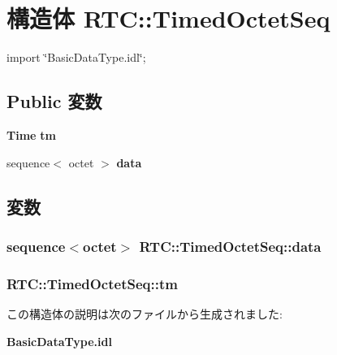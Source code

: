\section{構造体 RTC::TimedOctetSeq}
\label{structRTC_1_1TimedOctetSeq}


{\ttfamily import \char`\"{}BasicDataType.idl\char`\"{};}

\subsection*{Public 変数}
\begin{DoxyCompactItemize}
\item 
{\bf Time} {\bf tm}
\item 
sequence$<$ octet $>$ {\bf data}
\end{DoxyCompactItemize}


\subsection{変数}
\subsubsection[{data}]{\setlength{\rightskip}{0pt plus 5cm}sequence$<$octet$>$ {\bf RTC::TimedOctetSeq::data}}\label{structRTC_1_1TimedOctetSeq_a659ad5fe695a61f77ff3062fd3eec0e8}
\subsubsection[{tm}]{ {\bf RTC::TimedOctetSeq::tm}}\label{structRTC_1_1TimedOctetSeq_ae817c7f813ca89b392711dca53dc8c42}


この構造体の説明は次のファイルから生成されました:\begin{DoxyCompactItemize}
\item 
{\bf BasicDataType.idl}\end{DoxyCompactItemize}
